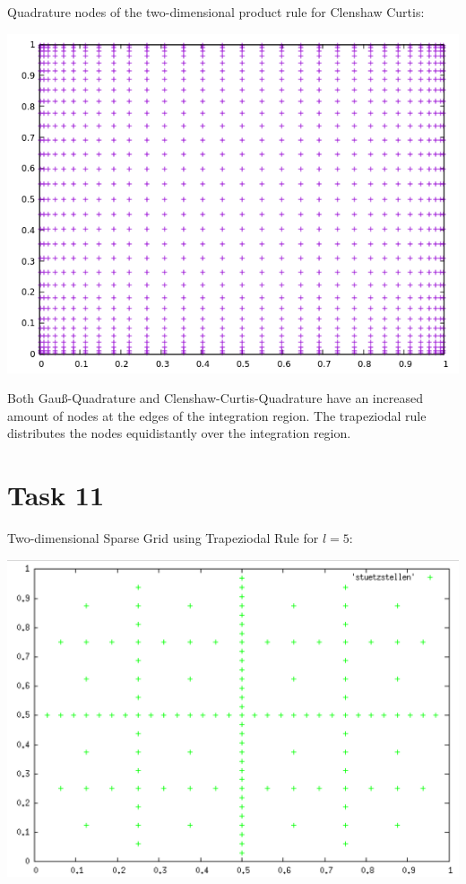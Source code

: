 \documentclass[10pt,a4paper]{article}
\begin{document}
Quadrature nodes of the two-dimensional product rule for Clenshaw Curtis:
\begin{center}
\includegraphics[scale=0.5]{quadrature_nodes_clenshaw_curtis.png}		
\end{center}

Both Gauß-Quadrature and Clenshaw-Curtis-Quadrature have an increased amount of nodes at the edges of the integration region. The trapeziodal rule distributes the nodes equidistantly over the integration region.

\section*{Task 11}


Two-dimensional Sparse Grid using Trapeziodal Rule for $l=5$:
\begin{center}
\includegraphics[scale=0.5]{sparse_grid_l5.png}	
\end{center}
\end{document}
